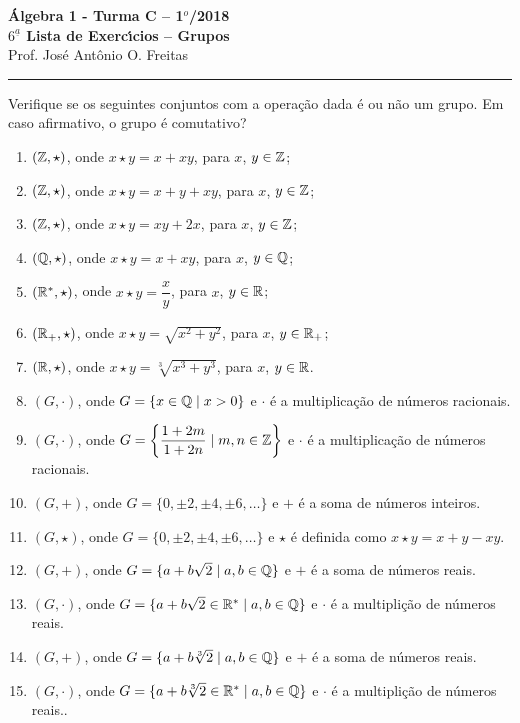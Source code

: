 \documentclass[12pt]{article}
\begin{document}


\begin{center}
{\Large\bf {\'A}lgebra 1 - Turma C -- 1$^{o}$/2018} \\ \vspace{9pt} {\large\bf
  $6^{\underline{a}}$ Lista de Exerc{\'\i}cios -- Grupos}\\
\vspace{9pt} Prof. Jos{\'e} Ant{\^o}nio O. Freitas
\end{center}
\hrule

\vspace{.6cm}
\questao{} Verifique se os seguintes conjuntos com a opera\c{c}\~ao dada \'e ou n\~ao um grupo. Em caso afirmativo, o grupo \'e comutativo?
\begin{enumerate}[label=({\alph*})]
	\item $(\mathbb{Z}, \star)$, onde $x \star y = x + xy$, para $x$, $y \in \mathbb{Z}$;
	\item $(\mathbb{Z}, \star)$, onde $x \star y = x + y + xy$, para $x$, $y \in \mathbb{Z}$;
	\item $(\mathbb{Z}, \star)$, onde $x \star y = xy + 2x$, para $x$, $y \in \mathbb{Z}$;
	\item $(\mathbb{Q}, \star)$, onde $x \star y = x + xy$, para $x$, $y \in \mathbb{Q}$;
	\item $(\mathbb{R}^*, \star)$, onde $x \star y = \dfrac{x}{y}$, para $x$, $y \in \mathbb{R}$;
	\item $(\mathbb{R}_+, \star)$, onde $x \star y = \sqrt{x^2 + y^2}$, para $x$, $y \in \mathbb{R}_+$;
	\item $(\mathbb{R}, \star)$, onde $x \star y = \sqrt[3]{x^3 + y^3}$, para $x$, $y \in \mathbb{R}$.
	\item $(G, \cdot)$, onde $G = \{x \in \mathbb{Q} \mid x > 0\}$ e $\cdot$ \'e a multiplica\c{c}\~ao de n\'umeros racionais.
	\item $(G, \cdot)$, onde $G = \left\{\dfrac{1 + 2m}{1 + 2n} \mid m, n \in \mathbb{Z}\right\}$ e $\cdot$ \'e a multiplica\c{c}\~ao de n\'umeros racionais.
	\item $(G, +)$, onde $G = \{0, \pm 2, \pm 4, \pm 6, \dots\}$ e $+$ \'e a soma de n\'umeros inteiros.
	\item $(G, \star)$, onde $G = \{0, \pm 2, \pm 4, \pm 6, \dots\}$ e $\star$ \'e definida como $x \star y = x + y - xy$.
	\item $(G, +)$, onde $G = \{a + b\sqrt{2} \mid a, b \in \mathbb{Q}\}$ e $+$ \'e a soma de n\'umeros reais.
	\item $(G, \cdot)$, onde $G = \{a + b\sqrt{2} \in \mathbb{R}^* \mid a, b \in \mathbb{Q}\}$ e $\cdot$ \'e a multipli\c{c}\~ao de n\'umeros reais.
	\item $(G, +)$, onde $G = \{a + b\sqrt[3]{2} \mid a, b \in \mathbb{Q}\}$ e $+$ \'e a soma de n\'umeros reais.
	\item $(G, \cdot)$, onde $G = \{a + b\sqrt[3]{2} \in \mathbb{R}^* \mid a, b \in \mathbb{Q}\}$ e $\cdot$ \'e a multipli\c{c}\~ao de n\'umeros reais..
\end{enumerate}
\end{document}

